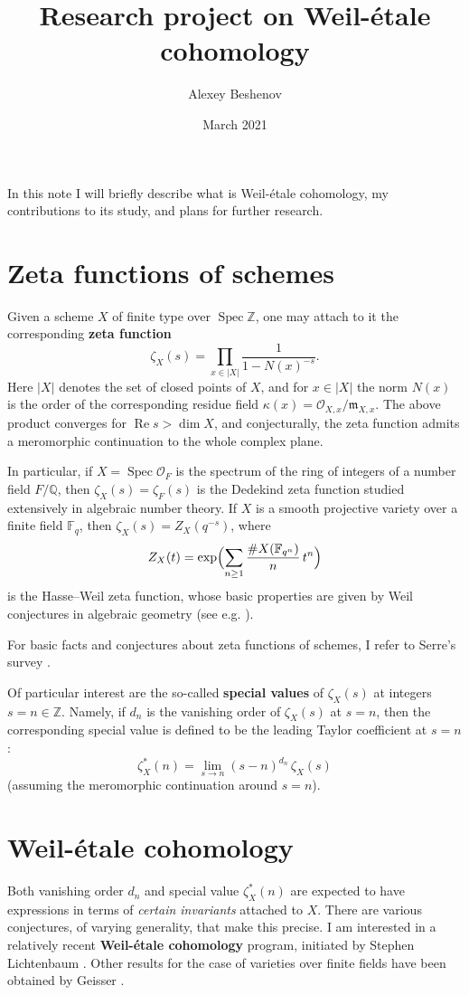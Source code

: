 \documentclass{article}
\author{Alexey Beshenov}
\date{March 2021}
\title{Research project on Weil-étale cohomology}
\DeclareMathOperator{\Spec}{Spec}
\newcommand{\ZZ}{\mathbb{Z}}
\newcommand{\FF}{\mathbb{F}}
\newcommand{\QQ}{\mathbb{Q}}
\renewcommand{\Re}{\operatorname{Re}}
\begin{document}
\maketitle

In this note I will briefly describe what is Weil-étale cohomology,
my contributions to its study, and plans for further research.

\section{Zeta functions of schemes}

Given a scheme $X$ of finite type over $\Spec \ZZ$, one may attach to it the
corresponding \textbf{zeta function}
$$\zeta_X (s) = \prod_{x \in |X|} \frac{1}{1 - N (x)^{-s}}.$$
Here $|X|$ denotes the set of closed points of $X$, and for $x \in |X|$ the norm
$N (x)$ is the order of the corresponding residue field
$\kappa (x) = \mathcal{O}_{X,x}/\mathfrak{m}_{X,x}$. The above product converges
for $\Re s > \dim X$, and conjecturally, the zeta function admits a meromorphic
continuation to the whole complex plane.

In particular, if $X = \Spec \mathcal{O}_F$ is the spectrum of the ring of
integers of a number field $F/\QQ$, then $\zeta_X (s) = \zeta_F (s)$ is the
Dedekind zeta function studied extensively in algebraic number theory. If $X$ is
a smooth projective variety over a finite field $\FF_q$, then
$\zeta_X (s) = Z_X (q^{-s})$, where
$$Z_X (t) = \exp \Bigl(\sum_{n\ge 1} \frac{\# X (\FF_{q^n})}{n}\,t^n\Bigr)$$
is the Hasse--Weil zeta function, whose basic properties are given by Weil
conjectures in algebraic geometry (see e.g. \cite{Katz-Motives}).

For basic facts and conjectures about zeta functions of schemes, I refer to
Serre's survey \cite{Serre-65}.

Of particular interest are the so-called \textbf{special values} of
$\zeta_X (s)$ at integers $s = n \in \ZZ$. Namely, if $d_n$ is the vanishing
order of $\zeta_X (s)$ at $s = n$, then the corresponding special value is
defined to be the leading Taylor coefficient at $s = n$:
$$\zeta_X^* (n) = \lim_{s \to n} (s - n)^{d_n}\,\zeta_X (s)$$
(assuming the meromorphic continuation around $s = n$).

\section{Weil-étale cohomology}

Both vanishing order $d_n$ and special value $\zeta_X^* (n)$ are expected to
have expressions in terms of \emph{certain invariants} attached to $X$. There
are various conjectures, of varying generality, that make this precise.  I am
interested in a relatively recent \textbf{Weil-étale cohomology} program,
initiated by Stephen Lichtenbaum
\cite{Lichtenbaum-05,Lichtenbaum-09-Euler,Lichtenbaum-09-number-rings}.  Other
results for the case of varieties over finite fields have been obtained by
Geisser \cite{Geisser-2004,Geisser-2006}.
\end{document}
